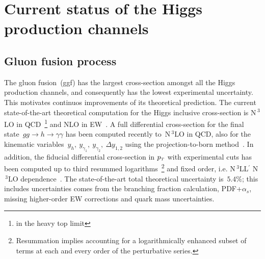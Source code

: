 \section{Current status of the Higgs production channels  \label{sec:singlehiggschannels}  }
\subsection{Gluon fusion process}
\par The  gluon fusion~(ggf) has the largest cross-section amongst all the Higgs production channels, and consequently has the lowest experimental uncertainty. This motivates continuos improvements of its theoretical prediction.  The current state-of-the-art theoretical computation for the Higgs inclusive cross-section is N$\,^3$LO in QCD~\footnote{in the heavy top limit} and NLO in EW~\cite{Bonetti:2018ukf}. A full differential cross-section for the final state~$ gg \to h \to \gamma \gamma$ has been computed recently to~N$\,^3$LO in QCD, also for the kinematic variables~$y_h, \ y_{\gamma_1},\ y_{\gamma_2},\ \Delta y_{1,2}$ using the projection-to-born method~\cite{Chen:2021isd}. In addition, the fiducial differential cross-section in $p_{\scriptscriptstyle T}$ with experimental cuts has been computed up to third resummed logarithms~\footnote{Resummation implies accounting for a logarithmically enhanced subset of terms at each and every order of the perturbative series.} and fixed order, i.e.  N$\,^3$LL$^\prime$   N$\,^3$LO dependence~\cite{Billis:2021ecs}. The state-of-the-art total theoretical uncertainty is~$5.4 \%$; this includes  uncertainties comes from the branching fraction calculation, PDF+$\alpha_s$, missing higher-order EW corrections and quark mass uncertainties. 
